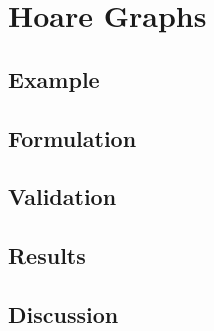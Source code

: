 \section{Hoare Graphs}

\subsection{Example}

\subsection{Formulation}

\subsection{Validation}

\subsection{Results}

\subsection{Discussion}

